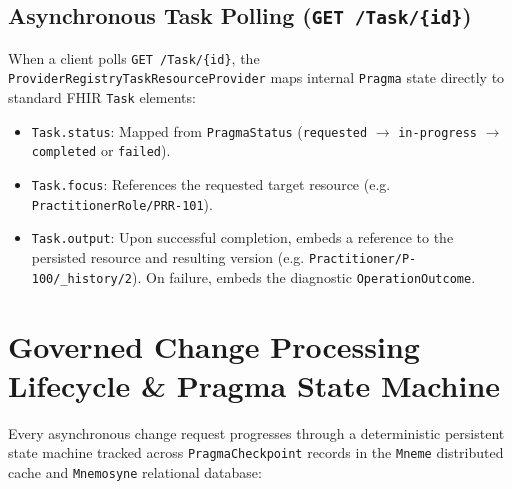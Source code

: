 \subsection{Asynchronous Task Polling (\texttt{GET /Task/\{id\}})}
When a client polls \texttt{GET /Task/\{id\}}, the \texttt{ProviderRegistryTaskResourceProvider} maps internal \texttt{Pragma} state directly to standard FHIR \texttt{Task} elements:
\begin{itemize}
    \item \texttt{Task.status}: Mapped from \texttt{PragmaStatus} (\texttt{requested} $\rightarrow$ \texttt{in-progress} $\rightarrow$ \texttt{completed} or \texttt{failed}).
    \item \texttt{Task.focus}: References the requested target resource (e.g. \texttt{PractitionerRole/PRR-101}).
    \item \texttt{Task.output}: Upon successful completion, embeds a reference to the persisted resource and resulting version (e.g. \texttt{Practitioner/P-100/\_history/2}). On failure, embeds the diagnostic \texttt{OperationOutcome}.
\end{itemize}

\section{Governed Change Processing Lifecycle \& Pragma State Machine}
\label{sec:pr_lifecycle}

Every asynchronous change request progresses through a deterministic persistent state machine tracked across \texttt{PragmaCheckpoint} records in the \texttt{Mneme} distributed cache and \texttt{Mnemosyne} relational database:

